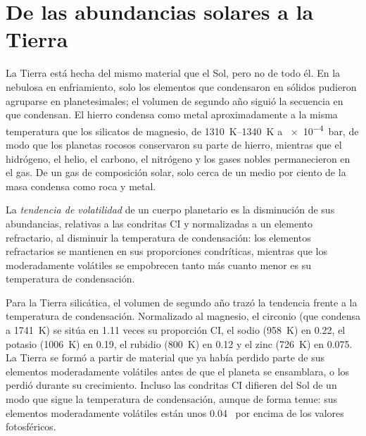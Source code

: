 \section{De las abundancias solares a la Tierra}\label{sec:b3:origin-of-elements:earth}

La Tierra está hecha del mismo material que el Sol, pero no de todo él. En la nebulosa
en enfriamiento, solo los elementos que condensaron en sólidos pudieron agruparse en
planetesimales; el volumen de segundo año siguió la secuencia en que condensan.
El hierro condensa como metal aproximadamente a la misma temperatura que los silicatos
de magnesio, de \qtyrange{1310}{1340}{K} a \qty{e-4}{bar}, de modo que los planetas
rocosos conservaron su parte de hierro, mientras que el hidrógeno, el helio, el carbono,
el nitrógeno y los gases nobles permanecieron en el gas.
De un gas de composición solar, solo cerca de un medio por ciento de la masa
condensa como roca y metal.

\begin{definition}\label{def:b3:origin-of-elements:volatility}
La \emph{tendencia de volatilidad} de un cuerpo planetario
es la disminución de sus abundancias, relativas a las condritas CI y
normalizadas a un elemento refractario, al disminuir la temperatura de condensación:
los elementos refractarios se mantienen en sus proporciones condríticas,
mientras que los moderadamente volátiles se empobrecen tanto más cuanto menor
es su temperatura de condensación.
\end{definition}

Para la Tierra silicática, el volumen de segundo año trazó la tendencia frente a la
temperatura de condensación. Normalizado al magnesio, el circonio (que condensa a
\qty{1741}{K}) se sitúa en \num{1.11} veces su proporción CI, el sodio
(\qty{958}{K}) en \num{0.22}, el potasio (\qty{1006}{K}) en \num{0.19},
el rubidio (\qty{800}{K}) en \num{0.12} y el zinc (\qty{726}{K}) en \num{0.075}.
La Tierra se formó a partir de material que ya había perdido parte de sus elementos
moderadamente volátiles antes de que el planeta se ensamblara, o los perdió durante
su crecimiento. Incluso las condritas CI difieren del Sol de un modo que sigue
la temperatura de condensación, aunque de forma tenue: sus elementos
moderadamente volátiles están unos \num{0.04}~ por encima de los valores
fotosféricos.

